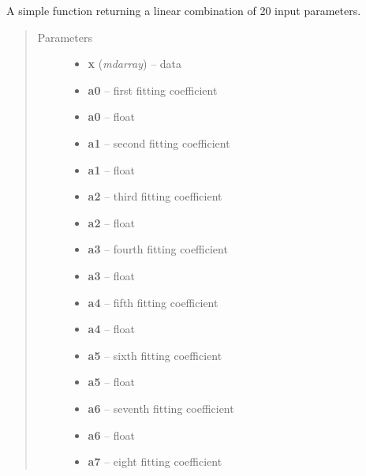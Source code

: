 \documentclass[a4paper,12pt,english]{sphinxmanual}
\begin{document}
\begin{fulllineitems}
\label{analysis:analysis.fitPSF.leastSQfit}
A simple function returning a linear combination of 20 input parameters.
\begin{quote}\begin{description}
\item[{Parameters}] \leavevmode\begin{itemize}
\item {} 
\textbf{x} (\emph{mdarray}) -- data

\item {} 
\textbf{a0} -- first fitting coefficient

\item {} 
\textbf{a0} -- float

\item {} 
\textbf{a1} -- second fitting coefficient

\item {} 
\textbf{a1} -- float

\item {} 
\textbf{a2} -- third fitting coefficient

\item {} 
\textbf{a2} -- float

\item {} 
\textbf{a3} -- fourth fitting coefficient

\item {} 
\textbf{a3} -- float

\item {} 
\textbf{a4} -- fifth fitting coefficient

\item {} 
\textbf{a4} -- float

\item {} 
\textbf{a5} -- sixth fitting coefficient

\item {} 
\textbf{a5} -- float

\item {} 
\textbf{a6} -- seventh fitting coefficient

\item {} 
\textbf{a6} -- float

\item {} 
\textbf{a7} -- eight fitting coefficient


\end{itemize}
\end{description}
\end{quote}
\end{fulllineitems}
\end{document}
